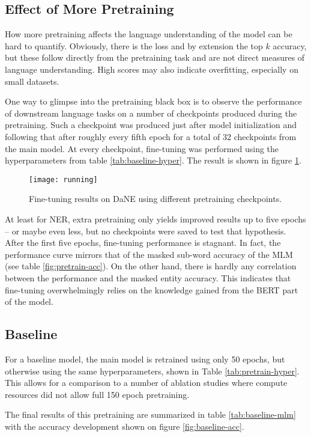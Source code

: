 \documentclass[main.tex]{subfiles}
\begin{document}
\subsection{Effect of More Pretraining}
How more pretraining affects the language understanding of the model can be hard to quantify.
Obviously, there is the loss and by extension the top $ k $ accuracy, but these follow directly from the pretraining task and are not direct measures of language understanding.
High scores may also indicate overfitting, especially on small datasets.

One way to glimpse into the pretraining black box is to observe the performance of downstream language tasks on a number of checkpoints produced during the pretraining.
Such a checkpoint was produced just after model initialization and following that after roughly every fifth epoch for a total of 32 checkpoints from the main model.
At every checkpoint, fine-tuning was performed using the hyperparameters from table \ref{tab:baseline-hyper}.
The result is shown in figure \ref{fig:running}.
\begin{figure}[H]
    \centering
    \texttt{[image: running]}
    \caption{Fine-tuning results on DaNE using different pretraining checkpoints.}
    \label{fig:running}
\end{figure}\noindent
At least for NER, extra pretraining only yields improved results up to five epochs -- or maybe even less, but no checkpoints were saved to test that hypothesis.
After the first five epochs, fine-tuning performance is stagnant.
In fact, the performance curve mirrors that of the masked sub-word accuracy of the MLM (see table \ref{fig:pretrain-acc}).
On the other hand, there is hardly any correlation between the performance and the masked entity accuracy.
This indicates that fine-tuning overwhelmingly relies on the knowledge gained from the BERT part of the model.

\subsection{Baseline}
For a baseline model, the main model is retrained using only 50 epochs, but otherwise using the same hyperparameters, shown in Table \ref{tab:pretrain-hyper}.
This allows for a comparison to a number of ablation studies where compute resources did not allow full 150 epoch pretraining.

The final results of this pretraining are summarized in table \ref{tab:baseline-mlm} with the accuracy development shown on figure \ref{fig:baseline-acc}.
\end{document}
